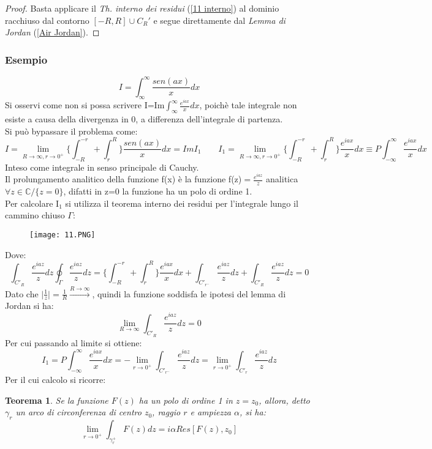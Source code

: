 \documentclass[twoside]{article}
\newtheorem{theorem}{Teorema}[section]
\begin{document}
\begin{proof}
Basta applicare il \textit{Th. interno dei residui} (\ref{11 interno}) al dominio racchiuso dal contorno $[-R,R] \cup C_R'$ e segue direttamente dal \textit{Lemma di Jordan} (\ref{Air Jordan}).
\end{proof}
\subsubsection{Esempio}
\begin{equation}
    I=\int_\infty^\infty\frac{sen(ax)}{x}dx
\end{equation}
Si osservi come non si possa scrivere I=Im$\int_\infty^\infty\frac{e^{iax}}{x}dx$, poichè tale integrale non esiste a causa della divergenza in 0, a differenza dell'integrale di partenza.\\
Si può bypassare il problema come:
\begin{equation}
    I=\lim_{R\to\infty,r\to0^+}\{\int_{-R}^{-r}+\int_r^R\}\frac{sen(ax)}{x}dx=ImI_1 \qquad I_1=\lim_{R\to\infty,r\to0^+}\{\int_{-R}^{-r}+\int_r^R\}\frac{e^{iax}}{x}dx\equiv P\int_{-\infty}^\infty\frac{e^{iax}}{x}dx
\end{equation}
Inteso come integrale in senso principale di Cauchy.\\
Il prolungamento analitico della funzione f(x) è la funzione f(z)$=\frac{e^{iaz}}{z}$ analitica $\forall z\in\mathds{C}/\{z=0\}$, difatti in z=0 la funzione ha un polo di ordine 1.\\
Per calcolare I$_1$ si utilizza il teorema interno dei residui per l'integrale lungo il cammino chiuso $\Gamma$:
\begin{figure}[H]
    \centering
    \texttt{[image: 11.PNG]}
    \label{fig:my_label}
\end{figure}
Dove:
\begin{equation}\int_{C'_R}\frac{e^{iaz}}{z}dz
    \oint_\Gamma\frac{e^{iaz}}{z}dz=\biggl\{\int_{-R}^{-r}+\int_r^R\biggr\}\frac{e^{iax}}{x}dx+\int_{C'_{r^-}}\frac{e^{iaz}}{z}dz+\int_{C'_R}\frac{e^{iaz}}{z}dz=0
\end{equation}
Dato che $\biggl|\frac{1}{z}\biggr|=\frac{1}{R}\xrightarrow{R\to\infty}$, quindi la funzione soddisfa le ipotesi del lemma di Jordan si ha:
\begin{equation}
    \lim_{R\to\infty}\int_{C'_R}\frac{e^{iaz}}{z}dz=0
\end{equation}
Per cui passando al limite si ottiene:
\begin{equation}
    I_1=P\int_{-\infty}^\infty\frac{e^{iax}}{x}dx=-\lim_{r\to 0^+}\int_{C'_{r^-}}\frac{e^{iaz}}{z}dz=\lim_{r\to 0^+}\int_{C'_r}\frac{e^{iaz}}{z}dz
\end{equation}
Per il cui calcolo si ricorre:
\begin{theorem}
Se la funzione $F(z)$ ha un polo di ordine 1 in $z=z_0$, allora, detto $\gamma_r$ un arco di circonferenza di centro $z_0$, raggio $r$ e ampiezza $\alpha$, si ha:
\begin{equation}
    \lim_{r\to 0^+}\int_{\gamma_r^+}F(z)dz=i\alpha Res[F(z),z_0]
\end{equation}

\end{theorem}
\end{document}
